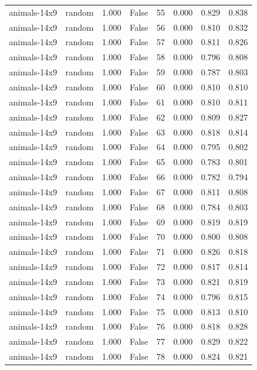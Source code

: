 \begin{tabular}{llrrrrrr}
animals-14x9 & random & 1.000 & False & 55 & 0.000 & 0.829 & 0.838 \\
animals-14x9 & random & 1.000 & False & 56 & 0.000 & 0.810 & 0.832 \\
animals-14x9 & random & 1.000 & False & 57 & 0.000 & 0.811 & 0.826 \\
animals-14x9 & random & 1.000 & False & 58 & 0.000 & 0.796 & 0.808 \\
animals-14x9 & random & 1.000 & False & 59 & 0.000 & 0.787 & 0.803 \\
animals-14x9 & random & 1.000 & False & 60 & 0.000 & 0.810 & 0.810 \\
animals-14x9 & random & 1.000 & False & 61 & 0.000 & 0.810 & 0.811 \\
animals-14x9 & random & 1.000 & False & 62 & 0.000 & 0.809 & 0.827 \\
animals-14x9 & random & 1.000 & False & 63 & 0.000 & 0.818 & 0.814 \\
animals-14x9 & random & 1.000 & False & 64 & 0.000 & 0.795 & 0.802 \\
animals-14x9 & random & 1.000 & False & 65 & 0.000 & 0.783 & 0.801 \\
animals-14x9 & random & 1.000 & False & 66 & 0.000 & 0.782 & 0.794 \\
animals-14x9 & random & 1.000 & False & 67 & 0.000 & 0.811 & 0.808 \\
animals-14x9 & random & 1.000 & False & 68 & 0.000 & 0.784 & 0.803 \\
animals-14x9 & random & 1.000 & False & 69 & 0.000 & 0.819 & 0.819 \\
animals-14x9 & random & 1.000 & False & 70 & 0.000 & 0.800 & 0.808 \\
animals-14x9 & random & 1.000 & False & 71 & 0.000 & 0.826 & 0.818 \\
animals-14x9 & random & 1.000 & False & 72 & 0.000 & 0.817 & 0.814 \\
animals-14x9 & random & 1.000 & False & 73 & 0.000 & 0.821 & 0.819 \\
animals-14x9 & random & 1.000 & False & 74 & 0.000 & 0.796 & 0.815 \\
animals-14x9 & random & 1.000 & False & 75 & 0.000 & 0.813 & 0.810 \\
animals-14x9 & random & 1.000 & False & 76 & 0.000 & 0.818 & 0.828 \\
animals-14x9 & random & 1.000 & False & 77 & 0.000 & 0.829 & 0.822 \\
animals-14x9 & random & 1.000 & False & 78 & 0.000 & 0.824 & 0.821 \\

\end{tabular}
